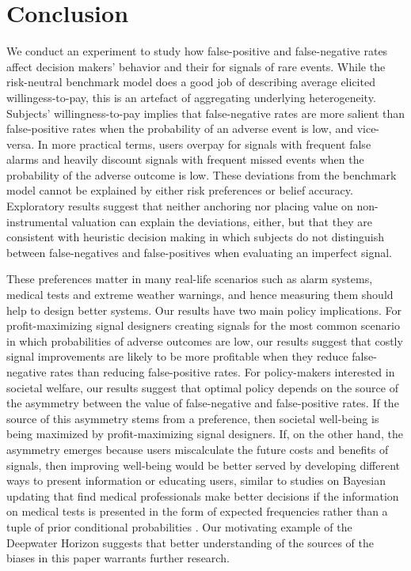 \documentclass[12pt,a4paper]{article}
\begin{document}
\section{Conclusion}

We conduct an experiment to study how false-positive and false-negative rates affect decision makers' behavior and their  for signals of rare events.  While the risk-neutral benchmark model does a good job of describing average elicited willingess-to-pay, this is an artefact of aggregating underlying heterogeneity.  Subjects' willingness-to-pay implies that false-negative rates are more salient than false-positive rates when the probability of an adverse event is low, and vice-versa. In more practical terms, users overpay for signals with frequent false alarms and heavily discount signals with frequent missed events when the probability of the adverse outcome is low. These deviations from the benchmark model cannot be explained by either risk preferences or belief accuracy.  Exploratory results suggest that neither anchoring nor placing value on non-instrumental valuation can explain the deviations, either, but that they are consistent with heuristic decision making in which subjects do not distinguish between false-negatives and false-positives when evaluating an imperfect signal.       

These preferences matter in many real-life scenarios such as alarm systems, medical tests and extreme weather warnings, and hence measuring them should help to design better systems.  Our results have two main policy implications.  For profit-maximizing signal designers creating signals for the most common scenario in which probabilities of adverse outcomes are low, our results suggest that costly signal improvements are likely to be more profitable when they reduce false-negative rates than reducing false-positive rates.  For policy-makers interested in societal welfare, our results suggest that optimal policy depends on the source of the asymmetry between the value of false-negative and false-positive rates.  If the source of this asymmetry stems from a preference, then societal well-being is being maximized by profit-maximizing signal designers.  If, on the other hand, the asymmetry emerges because users miscalculate the future costs and benefits of signals, then improving well-being would be better served by developing different ways to present information or educating users, similar to studies on Bayesian updating that find medical professionals make better decisions if the information on medical tests is presented in the form of expected frequencies rather than a tuple of prior conditional probabilities \citep{hoffrage_natural_2015, mcdowell_meta-analysis_2017}. Our motivating example of the Deepwater Horizon suggests that better understanding of the sources of the biases in this paper warrants further research. 
\end{document}
